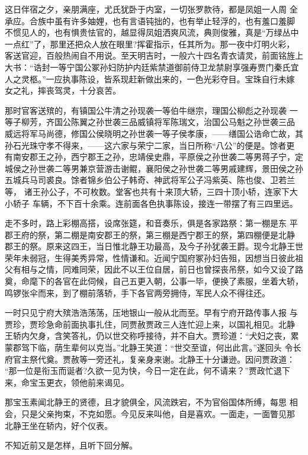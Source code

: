这日伴宿之夕，亲朋满座，尤氏犹卧于内室，一切张罗款待，都是凤姐一人周
全承应。合族中虽有许多妯娌，也有言语钝拙的，也有举止轻浮的，也有羞口羞脚
不惯见人的，也有惧贵怯官的，越显得凤姐洒爽风流，典则俊雅，真是“万绿丛中
一点红”了，那里还把众人放在眼里?挥霍指示，任其所为。那一夜中灯明火彩，
客送官迎，百般热闹自不用说。至天明吉时，一般六十四名青衣请灵，前面铭旌上
大书：“诰封一等宁国公冢孙妇防护内廷紫禁道御前侍卫龙禁尉享强寿贾门秦氏宜
人之灵柩。”一应执事陈设，皆系现赶新做出来的，一色光彩夺目。宝珠自行未嫁
女之礼，摔丧驾灵，十分哀苦。

那时官客送殡的，有镇国公牛清之孙现袭一等伯牛继宗，理国公柳彪之孙现袭
一等子柳芳，齐国公陈翼之孙世袭三品威镇将军陈瑞文，治国公马魁之孙世袭三品
威远将军马尚德，修国公侯晓明之孙世袭一等子侯孝康，——缮国公诰命亡故，其
孙石光珠守孝不得来，——这六家与荣宁二家，当日所称“八公”的便是。馀者更
有南安郡王之孙，西宁郡王之孙，忠靖侯史鼎，平原侯之孙世袭二等男蒋子宁，定
城侯之孙世袭二等男兼京营游击谢鲲，襄阳侯之孙世袭二等男戚建辉，景田侯之孙
五城兵马司裘良。馀者锦乡伯公子韩奇、神武将军公子冯紫英、陈也俊、卫若兰等，
诸王孙公子，不可枚数。堂客也共有十来顶大轿，三四十顶小轿，连家下大小轿子
车辆，不下百十余乘。连前面各色执事陈设，接连一带摆了有三四里远。

走不多时，路上彩棚高搭，设席张筵，和音奏乐，俱是各家路祭：第一棚是东
平郡王府的祭，第二棚是南安郡王的祭，第三棚是西宁郡王的祭，第四棚便是北静
郡王的祭。原来这四王，当日惟北静王功最高，及今子孙犹袭王爵。现今北静王世
荣年未弱冠，生得美秀异常，性情谦和。近闻宁国府冢孙妇告殂，因想当日彼此祖
父有相与之情，同难同荣，因此不以王位自居，前日也曾探丧吊祭，如今又设了路
奠，命麾下的各官在此伺候，自己五更入朝，公事一毕，便换了素服，坐着大轿，
鸣锣张伞而来，到了棚前落轿，手下各官两旁拥侍，军民人众不得往还。

一时只见宁府大殡浩浩荡荡，压地银山一般从北而至。早有宁府开路传事人报
与贾珍，贾珍急命前面执事扎住，同贾赦贾政三人连忙迎上来，以国礼相见。北静
王轿内欠身，含笑答礼，仍以世交称呼接待，并不自大。贾珍道：“犬妇之丧，累
蒙郡驾下临，荫生辈何以克当。”北静王笑道：“世交至谊，何出此言。”遂回头
令长府官主祭代奠。贾赦等一旁还礼，复亲身来谢。北静王十分谦逊。因问贾政道：
“那一位是衔玉而诞者?久欲一见为快，今日一定在此，何不请来？”贾政忙退下
来，命宝玉更衣，领他前来谒见。

那宝玉素闻北静王的贤德，且才貌俱全，风流跌宕，不为官俗国体所缚，每思
相会，只是父亲拘束，不克如愿。今见反来叫他，自是喜欢。一面走，一面瞥见那
北静王坐在轿内，好个仪表。

不知近前又是怎样，且听下回分解。
